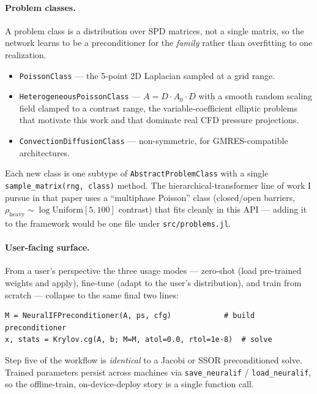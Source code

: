 \documentclass[11pt]{article}
\newcommand{\code}[1]{\texttt{\small #1}}
\begin{document}
\paragraph{Problem classes.} A problem class is a distribution over SPD matrices, not a single matrix, so the network learns to be a preconditioner for the \emph{family} rather than overfitting to one realization.

\begin{itemize}[leftmargin=*, itemsep=2pt, topsep=2pt]
\item \code{PoissonClass} --- the 5-point 2D Laplacian sampled at a grid range.
\item \code{HeterogeneousPoissonClass} --- $A = D \cdot A_0 \cdot D$ with a smooth random scaling field clamped to a contrast range, the variable-coefficient elliptic problems that motivate this work and that dominate real CFD pressure projections.
\item \code{ConvectionDiffusionClass} --- non-symmetric, for GMRES-compatible architectures.
\end{itemize}

Each new class is one subtype of \code{AbstractProblemClass} with a single \code{sample\_matrix(rng, class)} method. The hierarchical-transformer line of work I pursue in that paper uses a ``multiphase Poisson'' class (closed/open barriers, $\rho_{\text{heavy}} \sim \log\text{Uniform}[5,100]$ contrast) that fits cleanly in this API --- adding it to the framework would be one file under \code{src/problems.jl}.

\paragraph{User-facing surface.} From a user's perspective the three usage modes --- zero-shot (load pre-trained weights and apply), fine-tune (adapt to the user's distribution), and train from scratch --- collapse to the same final two lines:

\begin{lstlisting}
M = NeuralIFPreconditioner(A, ps, cfg)            # build preconditioner
x, stats = Krylov.cg(A, b; M=M, atol=0.0, rtol=1e-8)  # solve
\end{lstlisting}

Step five of the workflow is \emph{identical} to a Jacobi or SSOR preconditioned solve. Trained parameters persist across machines via \code{save\_neuralif} / \code{load\_neuralif}, so the offline-train, on-device-deploy story is a single function call.
\end{document}
